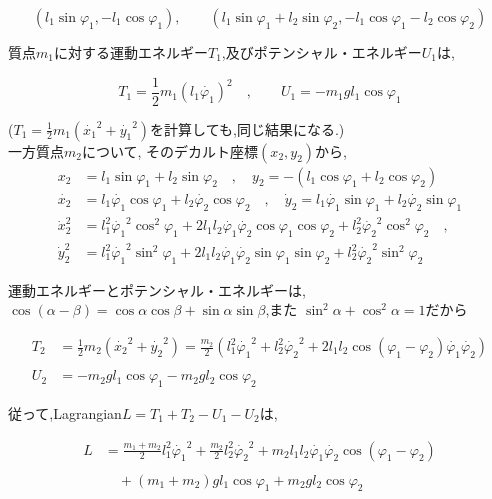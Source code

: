 \[
(l_1\sin\varphi_1, -l_1\cos\varphi_1), \qquad (l_1\sin\varphi_1+l_2\sin\varphi_2, -l_1\cos\varphi_1-l_2\cos\varphi_2)
\]

質点$m_1$に対する運動エネルギー$T_1$,及びポテンシャル・エネルギー$U_1$は,

\[
\displaystyle T_1=\frac{1}{2}m_1(l_1\dot{\varphi_1})^2\quad,\qquad U_1=-m_1gl_1\cos\varphi_1
\]

($\displaystyle T_1=\frac{1}{2}m_1(\dot{x_1}^2+\dot{y_1}^2)$を計算しても,同じ結果になる.)\\

一方質点$m_2$について, そのデカルト座標$(x_2,y_2)$から,
\begin{align*}
x_2&=l_1\sin\varphi_1+l_2\sin\varphi_2\quad,\quad y_2=-(l_1\cos\varphi_1+l_2\cos\varphi_2)\\
\dot{x_2}&=l_1\dot{\varphi_1}\cos\varphi_1+l_2\dot{\varphi_2}\cos\varphi_2\quad,\quad\dot{y}_2=l_1\dot{\varphi_1}\sin\varphi_1+l_2\dot{\varphi_2}\sin\varphi_1\\
\dot{x}_2^2&=l_1^2\dot{\varphi_1}^2\cos^2\varphi_1+2l_1l_2\dot{\varphi_1}\dot{\varphi_2}\cos\varphi_1\cos\varphi_2+l_2^2\dot{\varphi_2}^2\cos^2\varphi_2\quad,\\
\dot{y}_2^2&=l_1^2\dot{\varphi_1}^2\sin^2\varphi_1+2l_1l_2\dot{\varphi_1}\dot{\varphi_2}\sin\varphi_1\sin\varphi_2+l_2^2\dot{\varphi_2}^2\sin^2\varphi_2
\end{align*}

運動エネルギーとポテンシャル・エネルギーは,\\
$\cos(\alpha-\beta)=\cos\alpha\cos\beta+\sin\alpha\sin\beta$,また $\sin^2\alpha+\cos^2\alpha=1$だから

\begin{align*}
\displaystyle T_2&=\frac{1}{2}m_2(\dot{x_2}^2+\dot{y_2}^2)=\frac{m_2}{2}\left(l_1^2\dot{\varphi_1}^2+l_2^2\dot{\varphi_2}^2+2l_1l_2\cos(\varphi_1-\varphi_2)\dot{\varphi_1}\dot{\varphi_2}\right)\\\\
U_2&=-m_2gl_1\cos\varphi_1-m_2gl_2\cos\varphi_2
\end{align*}

従って,Lagrangian$L=T_1+T_2-U_1-U_2$は,

\begin{align*}
L&=\displaystyle\frac{m_1+m_2}{2}l_1^2\dot{\varphi_1}^2+\frac{m_2}{2}l_2^2\dot{\varphi_2}^2+m_2l_1l_2\dot{\varphi_1}\dot{\varphi_2}\cos(\varphi_1-\varphi_2)\\\\
&\quad+(m_1+m_2)gl_1\cos\varphi_1+m_2gl_2\cos\varphi_2
\end{align*}

